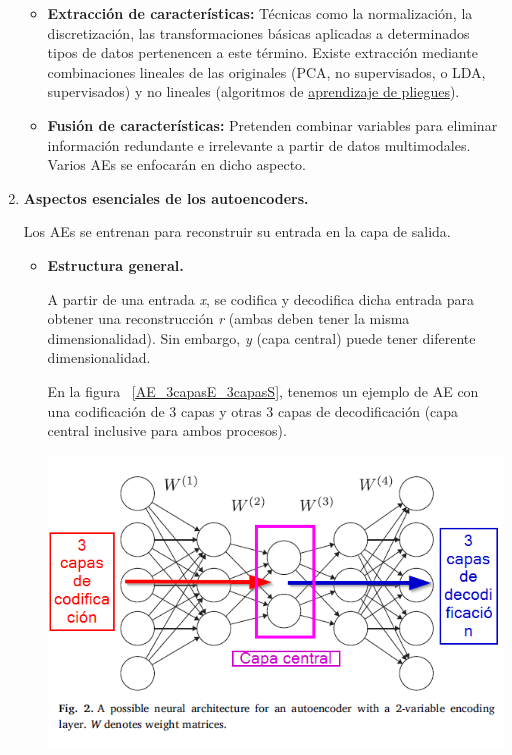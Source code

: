 \begin{enumerate}
\begin{itemize}
        \item \textbf{Extracción de características:} Técnicas como la normalización, la discretización, las transformaciones básicas aplicadas a determinados tipos de datos pertenencen a este término. Existe extracción mediante combinaciones lineales de las originales (PCA, no supervisados, o LDA, supervisados) y no lineales (algoritmos de \hyperlink{https://scikit-learn.org/stable/modules/manifold.html}{aprendizaje de pliegues}).
        
        \item \textbf{Fusión de características:} Pretenden combinar variables para eliminar información redundante e irrelevante a partir de datos multimodales. Varios AEs se enfocarán en dicho aspecto.
        
    \end{itemize}
    
    \newpage
    \item \textbf{Aspectos esenciales de los autoencoders.} \par Los AEs se entrenan para reconstruir su entrada en la capa de salida. 
    
    \begin{itemize}
        \item \textbf{Estructura general.}
            \par A partir de una entrada \textit{x}, se codifica y decodifica dicha entrada para obtener una reconstrucción \textit{r} (ambas deben tener la misma dimensionalidad). Sin embargo, \textit{y} (capa central) puede tener diferente dimensionalidad.
            
            En la figura ~\ref{AE_3capasE_3capasS}, tenemos un ejemplo de AE con una codificación de 3 capas y otras 3 capas de decodificación (capa central inclusive para ambos procesos).
            
            \begin{center}
                \includegraphics[width=.8\textwidth]{imagenes/AE_3capasE_3capasS.png} 
                \label{AE_3capasE_3capasS}
            \end{center}


\end{itemize}
\end{enumerate}
